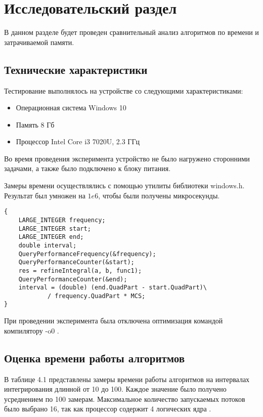 \chapter{Исследовательский раздел}

В данном разделе будет проведен сравнительный анализ алгоритмов по
времени и затрачиваемой памяти.

\section{Технические характеристики}

Тестирование выполнялось на устройстве со следующими характеристиками: 

\begin{itemize}
	\item Операционная система Windows 10 \cite{windows10}
	\item Память 8 Гб
	\item Процессор Intel Core i3 7020U, 2.3 ГГц \cite{intel}
\end{itemize}

Во время проведения эксперимента устройство не было нагружено сторонними задачами, а также было подключено к блоку питания.

Замеры времени осуществлялись с помощью утилиты библиотеки windows.h. Результат был умножен на $1e6$, чтобы были получены микросекунды.

\captionsetup{singlelinecheck = false, justification=raggedright}
\begin{lstlisting}[label=time, caption=Замер времени в микросекундах]
{
	LARGE_INTEGER frequency;
    LARGE_INTEGER start;
    LARGE_INTEGER end;
    double interval;
    QueryPerformanceFrequency(&frequency);
    QueryPerformanceCounter(&start);
    res = refineIntegral(a, b, func1);
    QueryPerformanceCounter(&end);
    interval = (double) (end.QuadPart - start.QuadPart)\
            / frequency.QuadPart * MCS;
}
\end{lstlisting}
\captionsetup{singlelinecheck = false, justification=centering}

При проведении эксперимента была отключена оптимизация командой компилятору -o0 \cite{std=c99}.

\section{Оценка времени работы алгоритмов}

В таблице 4.1 представлены замеры времени работы алгоритмов на интервалах интегрирования длинной от 10 до 100. Каждое значение было получено усреднением по 100 замерам. Максимальное количество запускаемых потоков было выбрано 16, так как процессор содержит 4 логических ядра \cite{intel}.


